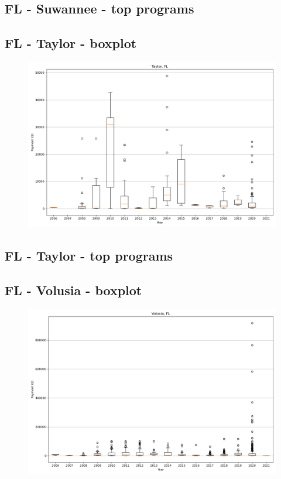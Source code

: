 \subsection*{FL - Suwannee - top programs}

\newpage
\subsection*{FL - Taylor - boxplot}
\begin{figure}[h]
\centering
\includegraphics[width=7in]{../output/boxplots/counties/Taylor-FL_boxplot.png}
\end{figure}


\subsection*{FL - Taylor - top programs}

\newpage
\subsection*{FL - Volusia - boxplot}
\begin{figure}[h]
\centering
\includegraphics[width=7in]{../output/boxplots/counties/Volusia-FL_boxplot.png}
\end{figure}


